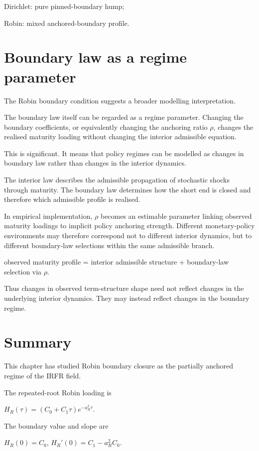 \documentclass[11pt,oneside]{book}
\begin{document}
Dirichlet: pure pinned-boundary hump;

Robin: mixed anchored-boundary profile.

\section{Boundary law as a regime
parameter}\label{boundary-law-as-a-regime-parameter}

The Robin boundary condition suggests a broader modelling
interpretation.

The boundary law itself can be regarded as a regime parameter. Changing
the boundary coefficients, or equivalently changing the anchoring ratio
$\rho$, changes the realised maturity loading without changing the interior
admissible equation.

This is significant. It means that policy regimes can be modelled as
changes in boundary law rather than changes in the interior dynamics.

The interior law describes the admissible propagation of stochastic
shocks through maturity. The boundary law determines how the short end
is closed and therefore which admissible profile is realised.

In empirical implementation, $\rho$ becomes an estimable parameter linking
observed maturity loadings to implicit policy anchoring strength.
Different monetary-policy environments may therefore correspond not to
different interior dynamics, but to different boundary-law selections
within the same admissible branch.

observed maturity profile = interior admissible structure + boundary-law
selection via $\rho$.

Thus changes in observed term-structure shape need not reflect changes
in the underlying interior dynamics. They may instead reflect changes in
the boundary regime.

\section{Summary}\label{summary-5}

This chapter has studied Robin boundary closure as the partially
anchored regime of the IRFR field.

The repeated-root Robin loading is

$H_R(\tau)=(C_0+C_1\tau)e^{-a_R^2\tau}$.

The boundary value and slope are

$H_R(0)=C_0$, $H_R'(0)=C_1-a_R^2C_0$.
\end{document}
